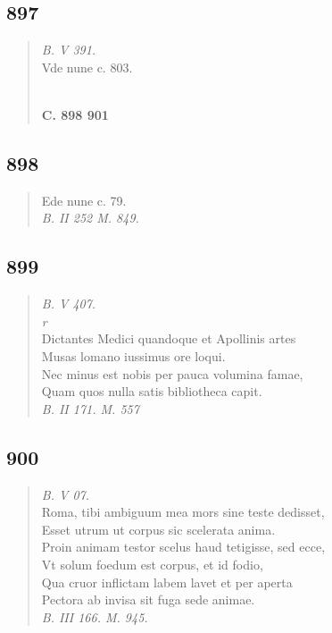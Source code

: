 \documentclass[11pt, a4paper]{report}
\begin{document}
            \subsection*{897}
      \begin{verse}
      \textit{B. V 391.} \\ Vde nune c. 803. \\ 
        ﻿\pagebreak 
     \marginpar{[340]} \begin{center} \textbf{C. 898 901} \end{center}
      \end{verse}
  
            \subsection*{898}
      \begin{verse}
      Ede nune c. 79. \\ \textit{B. II 252 M. 849.} \\ 
      \end{verse}
  
            \subsection*{899}
      \begin{verse}
      \textit{B. V 407.} \\ \textit{r} \\ Dictantes Medici quandoque et Apollinis artes \\ Musas lomano iussimus ore loqui. \\ Nec minus est nobis per pauca volumina famae, \\ Quam quos nulla satis bibliotheca capit. \\ \textit{B. II 171. M. 557} \\ 
      \end{verse}
  
            \subsection*{900}
      \begin{verse}
      \textit{B. V 07.} \\ Roma, tibi ambiguum mea mors sine teste dedisset, \\ Esset utrum ut corpus sic scelerata anima. \\ Proin animam testor scelus haud tetigisse, sed ecce, \\ Vt solum foedum est corpus, et id fodio, \\ Qua cruor inflictam labem lavet et per aperta \\ Pectora ab invisa sit fuga sede animae. \\ \textit{B. III 166. M. 945.} \\ 
      \end{verse}
  
\end{document}
